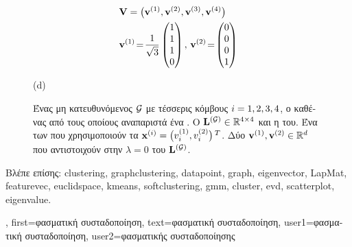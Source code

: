 {{\begin{figure}[H]
\begin{center}
\begin{minipage}{0.4\textwidth}
					\begin{align}
					& \mathbf{V} = \big( {\bf v}^{(1)},{\bf v}^{(2)},{\bf v}^{(3)},{\bf v}^{(4)} \big) \nonumber \\
					&	\mathbf{v}^{(1)}\!=\!\frac{1}{\sqrt{3}} \begin{pmatrix} 1 \\ 1 \\ 1 \\ 0 \end{pmatrix}, \,
					\mathbf{v}^{(2)}\!=\!\begin{pmatrix} 0 \\ 0 \\ 0 \\ 1 \end{pmatrix} \nonumber 
					\end{align}
					\begin{minipage}{\textwidth}
						\vspace{10ex}
						\centering
						{\selectfont (d)}
					\end{minipage}
				\end{minipage} 
				{
				\caption{\label{fig_lap_mtx_specclustering_dict}  \foreignlanguage{greek}{Ένας 
					μη κατευθυνόμενος}  $\mathcal{G}$ \foreignlanguage{greek}{με τέσσερις 
					κόμβους $i=1,2,3,4$, ο καθένας από τους οποίους αναπαριστά ένα} . 
					 \foreignlanguage{greek}{Ο}  
					${\bf L}^{(\mathcal{G})} \in \mathbb{R}^{4 \times 4}$ \foreignlanguage{greek}{και η}  
					\foreignlanguage{greek}{του}.  \foreignlanguage{greek}{Ένα} 
					 \foreignlanguage{greek}{των}  \foreignlanguage{greek}{που 
					χρησιμοποιούν τα}  
					${\bf x}^{(i)} = \big( v^{(1)}_{i},v^{(2)}_{i} \big)\,^{T}$. 
					 \foreignlanguage{greek}{Δύο}  
					${\bf v}^{(1)},{\bf v}^{(2)} \in \mathbb{R}^{d}$ \foreignlanguage{greek}{που αντιστοιχούν στην} 
					 $\lambda=0$ \foreignlanguage{greek}{του}  ${\bf L}^{(\mathcal{G})}$. } }
			\end{center}
		\end{figure}
		\newpage
		\foreignlanguage{greek}{Βλέπε επίσης:} \gls{clustering}, \gls{graphclustering}, \gls{datapoint}, \gls{graph}, \gls{eigenvector}, \gls{LapMat}, 
		\gls{featurevec}, \gls{euclidspace}, \gls{kmeans}, \gls{softclustering}, \gls{gmm}, \gls{cluster}, \gls{evd}, \gls{scatterplot}, \gls{eigenvalue}.}, 
	first={\foreignlanguage{greek}{φασματική συσταδοποίηση}},
	text={\foreignlanguage{greek}{φασματική συσταδοποίηση}},
	user1={\foreignlanguage{greek}{φασματική συσταδοποίηση}}, %
    	user2={\foreignlanguage{greek}{φασματικής συσταδοποίησης}} %
}

